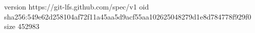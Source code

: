 version https://git-lfs.github.com/spec/v1
oid sha256:549e62d258104af72f11a45aa5d9acf55aa102625048279d1e8d784778f929f0
size 452983
